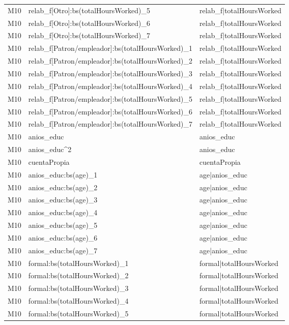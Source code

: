 \begin{longtable}{lll}
M10 & relab\_f[Otro]:bs(totalHoursWorked)\_5 & relab\_f|totalHoursWorked \\
M10 & relab\_f[Otro]:bs(totalHoursWorked)\_6 & relab\_f|totalHoursWorked \\
M10 & relab\_f[Otro]:bs(totalHoursWorked)\_7 & relab\_f|totalHoursWorked \\
M10 & relab\_f[Patron/empleador]:bs(totalHoursWorked)\_1 & relab\_f|totalHoursWorked \\
M10 & relab\_f[Patron/empleador]:bs(totalHoursWorked)\_2 & relab\_f|totalHoursWorked \\
M10 & relab\_f[Patron/empleador]:bs(totalHoursWorked)\_3 & relab\_f|totalHoursWorked \\
M10 & relab\_f[Patron/empleador]:bs(totalHoursWorked)\_4 & relab\_f|totalHoursWorked \\
M10 & relab\_f[Patron/empleador]:bs(totalHoursWorked)\_5 & relab\_f|totalHoursWorked \\
M10 & relab\_f[Patron/empleador]:bs(totalHoursWorked)\_6 & relab\_f|totalHoursWorked \\
M10 & relab\_f[Patron/empleador]:bs(totalHoursWorked)\_7 & relab\_f|totalHoursWorked \\
M10 & anios\_educ & anios\_educ \\
M10 & anios\_educ\textasciicircum 2 & anios\_educ \\
M10 & cuentaPropia & cuentaPropia \\
M10 & anios\_educ:bs(age)\_1 & age|anios\_educ \\
M10 & anios\_educ:bs(age)\_2 & age|anios\_educ \\
M10 & anios\_educ:bs(age)\_3 & age|anios\_educ \\
M10 & anios\_educ:bs(age)\_4 & age|anios\_educ \\
M10 & anios\_educ:bs(age)\_5 & age|anios\_educ \\
M10 & anios\_educ:bs(age)\_6 & age|anios\_educ \\
M10 & anios\_educ:bs(age)\_7 & age|anios\_educ \\
M10 & formal:bs(totalHoursWorked)\_1 & formal|totalHoursWorked \\
M10 & formal:bs(totalHoursWorked)\_2 & formal|totalHoursWorked \\
M10 & formal:bs(totalHoursWorked)\_3 & formal|totalHoursWorked \\
M10 & formal:bs(totalHoursWorked)\_4 & formal|totalHoursWorked \\
M10 & formal:bs(totalHoursWorked)\_5 & formal|totalHoursWorked \\

\end{longtable}
